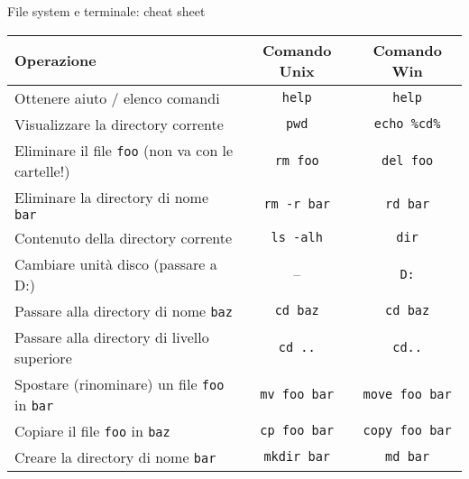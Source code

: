 \documentclass[xcolor=dvipsnames,presentation]{beamer}
\begin{document}
\begin{frame}[fragile]{File system e terminale: cheat sheet}
\label{slide:commands}
  \begin{center}
    \begin{tabular}{| l | c | c |}
      \hline
      \textbf{Operazione} & \textbf{Comando Unix} & \textbf{Comando Win} \\ \hline
            \scriptsize{}Ottenere aiuto / elenco comandi & \texttt{help} & \texttt{help}  \\ \hline
      \scriptsize{}Visualizzare la directory corrente & \texttt{pwd} & \texttt{echo \%cd\%}  \\ \hline
      \scriptsize{}Eliminare il file \texttt{foo} (non va con le cartelle!) & \texttt{rm foo} & \texttt{del foo} \\ \hline
      \scriptsize{}Eliminare la directory di nome \texttt{bar} & \texttt{rm -r bar} & \texttt{rd bar} \\ \hline
      \scriptsize{}Contenuto della directory corrente & \texttt{ls -alh} & \texttt{dir} \\ \hline
      \scriptsize{}Cambiare unità disco (passare a D:) & -- & \texttt{D:} \\ \hline
      \scriptsize{}Passare alla directory di nome \texttt{baz} & \texttt{cd baz} & \texttt{cd baz} \\ \hline
      \scriptsize{}Passare alla directory di livello superiore & \texttt{cd ..} & \texttt{cd..} \\ \hline
      \scriptsize{}Spostare (rinominare) un file \texttt{foo} in \texttt{bar} & \texttt{mv foo bar} & \texttt{move foo bar} \\ \hline
      \scriptsize{}Copiare il file \texttt{foo} in \texttt{baz} & \texttt{cp foo bar} & \texttt{copy foo bar} \\ \hline
      \scriptsize{}Creare la directory di nome \texttt{bar} & \texttt{mkdir bar} & \texttt{md bar} \\ \hline
    \end{tabular}
  \end{center}
\end{frame}
\end{document}
